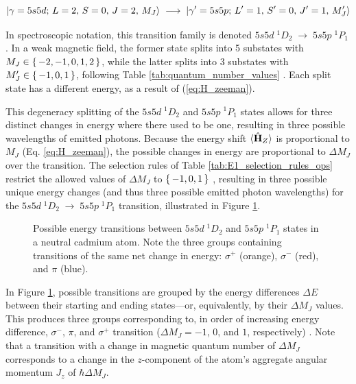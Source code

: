 \documentclass[11pt]{article}
\begin{document}
\begin{equation}
\ket{\gamma=5s5d;\,L=2,\,S=0,\,J=2,\,M_J}
\;\longrightarrow\;
\ket{\gamma'=5s5p;\,L'=1,\,S'=0,\,J'=1,\,M_J'}
\label{eq:cd_transition}
\end{equation}

In spectroscopic notation, this transition family is denoted $5s5d\;{}^{1}D_{2} \;\longrightarrow\;5s5p\;{}^{1}P_{1}$ \cite{harris}. In a weak magnetic field, the former state splits into 5 substates with $M_J \in \set{ -2, -1, 0, 1, 2}$, while the latter splits into 3 substates with $M_J' \in \set{-1, 0, 1}$, following Table \ref{tab:quantum_number_values} \cite{harris,griffiths_qm,qmech}. Each split state has a different energy, as a result of (\ref{eq:H_zeeman}).

This degeneracy splitting of the $5s5d\;{}^{1}D_{2}$ and $5s5p\;{}^{1}P_{1}$ states allows for three distinct changes in energy where there used to be one, resulting in three possible wavelengths of emitted photons. Because the energy shift $\braket{\hat {\mathbf H}_Z}$ is proportional to $M_J$ (Eq. \ref{eq:H_zeeman}), the possible changes in energy are proportional to $\Delta M_J$ over the transition. The selection rules of Table \ref{tab:E1_selection_rules_ops} restrict the allowed values of $\Delta M_J$ to $\set{-1, 0, 1}$ \cite{harris}, resulting in three possible unique energy changes (and thus three possible emitted photon wavelengths) for the $5s5d\;{}^{1}D_{2} \;\longrightarrow\;5s5p\;{}^{1}P_{1}$ transition, illustrated in Figure \ref{fig:energy_levels}.

\begin{figure}[H]
    \centering
    
    \caption{Possible energy transitions between $5s5d\;{}^{1}D_{2}$ and $5s5p\;{}^{1}P_{1}$ states in a neutral cadmium atom. Note the three groups containing transitions of the same net change in energy: $\sigma^+$ (orange), $\sigma^-$ (red), and $\pi$ (blue).}
    \label{fig:energy_levels}
\end{figure}
In Figure \ref{fig:energy_levels}, possible transitions are grouped by the energy differences $\Delta E$ between their starting and ending states---or, equivalently, by their $\Delta M_J$ values. This produces three groups corresponding to, in order of increasing energy difference, $\sigma^-$, $\pi$, and $\sigma^+$ transition ($\Delta M_J = -1$, $0$, and $1$, respectively) \cite{leybold}. Note that a transition with a change in magnetic quantum number of $\Delta M_J$ corresponds to a change in the $z$-component of the atom's aggregate angular momentum $J_z$ of $\hbar \Delta M_J$.
\end{document}
